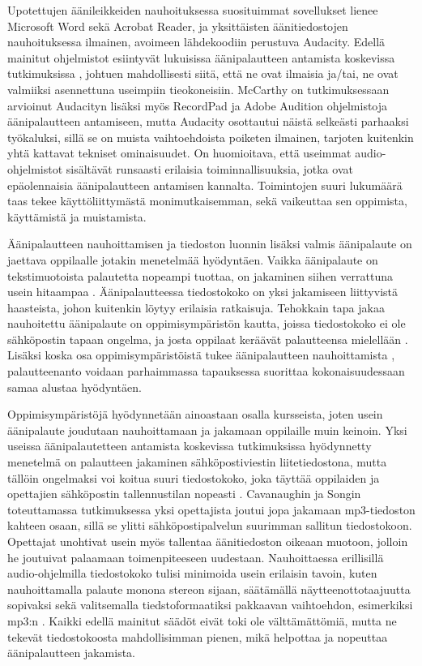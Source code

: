\documentclass[utf8]{gradu3}
\begin{document}
Upotettujen äänileikkeiden nauhoituksessa suosituimmat sovellukset lienee Microsoft Word sekä Acrobat Reader, ja yksittäisten äänitiedostojen nauhoituksessa ilmainen, avoimeen lähdekoodiin perustuva Audacity. Edellä mainitut ohjelmistot esiintyvät lukuisissa äänipalautteen antamista koskevissa tutkimuksissa \parencite[][]{using, ice, principles, evaluating, areYouListening, engaging, academics, attitudes, versus}, johtuen mahdollisesti siitä, että ne ovat ilmaisia ja/tai, ne ovat valmiiksi asennettuna useimpiin tieokoneisiin. McCarthy \parencite[][]{evaluating} on tutkimuksessaan arvioinut Audacityn lisäksi myös RecordPad ja Adobe Audition ohjelmistoja äänipalautteen antamiseen, mutta Audacity osottautui näistä selkeästi parhaaksi työkaluksi, sillä se on muista vaihtoehdoista poiketen ilmainen, tarjoten kuitenkin yhtä kattavat tekniset ominaisuudet. On huomioitava, että useimmat audio-ohjelmistot sisältävät runsaasti erilaisia toiminnallisuuksia, jotka ovat epäolennaisia äänipalautteen antamisen kannalta. Toimintojen suuri lukumäärä taas tekee käyttöliittymästä monimutkaisemman, sekä vaikeuttaa sen oppimista, käyttämistä ja muistamista.

Äänipalautteen nauhoittamisen ja tiedoston luonnin lisäksi valmis äänipalaute on jaettava oppilaalle jotakin menetelmää hyödyntäen. Vaikka äänipalaute on tekstimuotoista palautetta nopeampi tuottaa, on jakaminen siihen verrattuna usein hitaampaa \parencite[][]{evaluating}. Äänipalautteessa tiedostokoko on yksi jakamiseen liittyvistä haasteista, johon kuitenkin löytyy erilaisia ratkaisuja. Tehokkain tapa jakaa nauhoitettu äänipalaute on oppimisympäristön kautta, joissa tiedostokoko ei ole sähköpostin tapaan ongelma, ja josta oppilaat keräävät palautteensa mielellään \parencite[][]{areYouListening}. Lisäksi koska osa oppimisympäristöistä tukee äänipalautteen nauhoittamista \parencite[][]{using}, palautteenanto voidaan parhaimmassa tapauksessa suorittaa kokonaisuudessaan samaa alustaa hyödyntäen. 

Oppimisympäristöjä hyödynnetään ainoastaan osalla kursseista, joten usein äänipalaute joudutaan nauhoittamaan ja jakamaan oppilaille muin keinoin. Yksi useissa äänipalautetteen antamista koskevissa tutkimuksissa hyödynnetty menetelmä on palautteen jakaminen sähköpostiviestin liitetiedostona, mutta tällöin ongelmaksi voi koitua suuri tiedostokoko, joka täyttää oppilaiden ja opettajien sähköpostin tallennustilan nopeasti \parencite[][]{developing}. Cavanaughin ja Songin \parencite*[][]{versus} toteuttamassa tutkimuksessa yksi opettajista joutui jopa jakamaan mp3-tiedoston kahteen osaan, sillä se ylitti sähköpostipalvelun suurimman sallitun tiedostokoon. Opettajat unohtivat usein myös tallentaa äänitiedoston oikeaan muotoon, jolloin he joutuivat palaamaan toimenpiteeseen uudestaan. Nauhoittaessa erillisillä audio-ohjelmilla tiedostokoko tulisi minimoida usein erilaisin tavoin, kuten nauhoittamalla palaute monona stereon sijaan, säätämällä näytteenottotaajuutta sopivaksi \parencite[][]{voice} sekä valitsemalla tiedstoformaatiksi pakkaavan vaihtoehdon, esimerkiksi mp3:n \parencite[][]{engaging}. Kaikki edellä mainitut säädöt eivät toki ole välttämättömiä, mutta ne tekevät tiedostokoosta mahdollisimman pienen, mikä helpottaa ja nopeuttaa äänipalautteen jakamista. 
\end{document}
